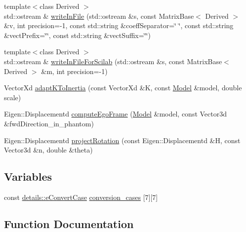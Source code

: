 \begin{DoxyCompactItemize}
\item 
{\footnotesize template$<$class Derived $>$ }\\std\+::ostream \& \hyperlink{namespaceocra_1_1utils_af94bc08a67cf20092611bb37f4528b28}{write\+In\+File} (std\+::ostream \&s, const Matrix\+Base$<$ Derived $>$ \&v, int precision=-\/1, const std\+::string \&coeff\+Separator=\char`\"{} \char`\"{}, const std\+::string \&vect\+Prefix=\char`\"{}\char`\"{}, const std\+::string \&vect\+Suffix=\char`\"{}\char`\"{})
\item 
{\footnotesize template$<$class Derived $>$ }\\std\+::ostream \& \hyperlink{namespaceocra_1_1utils_a11933c4ad5ae5b9bdce3005941bdd433}{write\+In\+File\+For\+Scilab} (std\+::ostream \&s, const Matrix\+Base$<$ Derived $>$ \&m, int precision=-\/1)
\item 
Vector\+Xd \hyperlink{namespaceocra_1_1utils_acfdf52324cf9c44fbe5225d17d5ff926}{adapt\+K\+To\+Inertia} (const Vector\+Xd \&K, const \hyperlink{classocra_1_1Model}{Model} \&model, double scale)
\item 
Eigen\+::\+Displacementd \hyperlink{namespaceocra_1_1utils_aaad3b464589711bcc5fecec8c8b9af76}{compute\+Ego\+Frame} (\hyperlink{classocra_1_1Model}{Model} \&model, const Vector3d \&fwd\+Direction\+\_\+in\+\_\+phantom)
\item 
Eigen\+::\+Displacementd \hyperlink{namespaceocra_1_1utils_a07cf93b22e02458b2c184ddd5787a6b2}{project\+Rotation} (const Eigen\+::\+Displacementd \&H, const Vector3d \&n, double \&theta)
\end{DoxyCompactItemize}
\subsection*{Variables}
\begin{DoxyCompactItemize}
\item 
const \hyperlink{namespaceocra_1_1utils_1_1details_a617d399055aa54cfdf2d3199ca91c399}{details\+::e\+Convert\+Case} \hyperlink{namespaceocra_1_1utils_a4775079ee4f9f6c7620af882e8092c62}{conversion\+\_\+cases} \mbox{[}7\mbox{]}\mbox{[}7\mbox{]}
\end{DoxyCompactItemize}


\subsection{Function Documentation}
\hypertarget{namespaceocra_1_1utils_acfdf52324cf9c44fbe5225d17d5ff926}{}\label{namespaceocra_1_1utils_acfdf52324cf9c44fbe5225d17d5ff926} 
